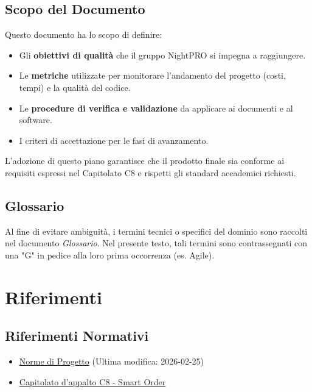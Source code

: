 \documentclass[a4paper,11pt,oneside]{scrartcl}
\begin{document}
\subsection{Scopo del Documento}
Questo documento ha lo scopo di definire:
\begin{itemize}
    \item Gli \textbf{obiettivi di qualità} che il gruppo NightPRO si impegna a raggiungere.
    \item Le \textbf{metriche} utilizzate per monitorare l'andamento del progetto (costi, tempi) e la qualità del codice.
    \item Le \textbf{procedure di verifica e validazione} da applicare ai documenti e al software.
    \item I criteri di accettazione per le fasi di avanzamento.
\end{itemize}

L'adozione di questo piano garantisce che il prodotto finale sia conforme ai requisiti espressi nel Capitolato C8 e rispetti gli standard accademici richiesti.

\subsection{Glossario}
Al fine di evitare ambiguità, i termini tecnici o specifici del dominio sono raccolti nel documento \textit{Glossario}.
Nel presente testo, tali termini sono contrassegnati con una "G" in pedice alla loro prima occorrenza (es. Agile{\scriptsize{}}).

\section{Riferimenti}

\subsection{Riferimenti Normativi}
\begin{itemize}
    \item \href{https://github.com/swenightpro/Documentazione/blob/main/docs/RTB/Documentazione%20Interna}{Norme di Progetto} (Ultima modifica: 2026-02-25)
    \item \href{https://www.math.unipd.it/~tullio/IS-1/2025/Progetto/C8.pdf}{Capitolato d'appalto C8 - Smart Order}
\end{itemize}
\end{document}
